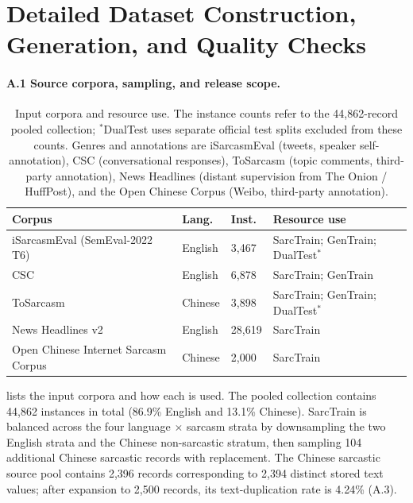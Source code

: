 \section{Detailed Dataset Construction, Generation, and Quality Checks}
\label{app:data}

\paragraph{A.1 Source corpora, sampling, and release scope.}

\begin{table}[h]
  \centering
  \small
  \begin{tabular}{@{}p{2.0cm}p{1.1cm}p{0.9cm}p{2.2cm}@{}}
    \toprule
    \textbf{Corpus} & \textbf{Lang.} & \textbf{Inst.} & \textbf{Resource use} \\
    \midrule
    iSarcasmEval (SemEval-2022 T6) & English & 3{,}467 & SarcTrain; GenTrain; DualTest$^{\ast}$ \\
    CSC & English & 6{,}878 & SarcTrain; GenTrain \\
    ToSarcasm & Chinese & 3{,}898 & SarcTrain; GenTrain; DualTest$^{\ast}$ \\
    News Headlines v2 & English & 28{,}619 & SarcTrain \\
    Open Chinese Internet Sarcasm Corpus & Chinese & 2{,}000 & SarcTrain \\
    \bottomrule
  \end{tabular}
  \caption{Input corpora and resource use. The instance counts refer to the 44{,}862-record pooled collection; $^{\ast}$DualTest uses separate official test splits excluded from these counts. Genres and annotations are iSarcasmEval (tweets, speaker self-annotation), CSC (conversational responses), ToSarcasm (topic comments, third-party annotation), News Headlines (distant supervision from The Onion / HuffPost), and the Open Chinese Corpus (Weibo, third-party annotation).}
  \label{tab:sources}
\end{table}

 lists the input corpora and how each is used. The pooled collection contains 44{,}862 instances in total (86.9\% English and 13.1\% Chinese). SarcTrain is balanced across the four language $\times$ sarcasm strata by downsampling the two English strata and the Chinese non-sarcastic stratum, then sampling 104 additional Chinese sarcastic records with replacement. The Chinese sarcastic source pool contains 2{,}396 records corresponding to 2{,}394 distinct stored text values; after expansion to 2{,}500 records, its text-duplication rate is 4.24\% (A.3).

